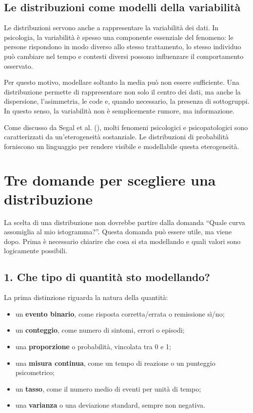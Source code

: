 \documentclass[
  italian,
  letterpaper,
  a4paper,
  11pt,
  open=any]{scrbook}
\providecommand{\tightlist}{%
  \setlength{\itemsep}{0pt}\setlength{\parskip}{0pt}}
\theoremstyle{plain}
\theoremstyle{definition}
\theoremstyle{definition}
\theoremstyle{remark}
\begin{document}
\subsection{Le distribuzioni come modelli della
variabilità}\label{le-distribuzioni-come-modelli-della-variabilituxe0}

Le distribuzioni servono anche a rappresentare la variabilità dei dati.
In psicologia, la variabilità è spesso una componente essenziale del
fenomeno: le persone rispondono in modo diverso allo stesso trattamento,
lo stesso individuo può cambiare nel tempo e contesti diversi possono
influenzare il comportamento osservato.

Per questo motivo, modellare soltanto la media può non essere
sufficiente. Una distribuzione permette di rappresentare non solo il
centro dei dati, ma anche la dispersione, l'asimmetria, le code e,
quando necessario, la presenza di sottogruppi. In questo senso, la
variabilità non è semplicemente rumore, ma informazione.

Come discusso da Segal et al. (),
molti fenomeni psicologici e psicopatologici sono caratterizzati da
un'eterogeneità sostanziale. Le distribuzioni di probabilità forniscono
un linguaggio per rendere visibile e modellabile questa eterogeneità.

\section{Tre domande per scegliere una
distribuzione}\label{sec-three-questions-distributions}

La scelta di una distribuzione non dovrebbe partire dalla domanda
``Quale curva assomiglia al mio istogramma?''. Questa domanda può essere
utile, ma viene dopo. Prima è necessario chiarire che cosa si sta
modellando e quali valori sono logicamente possibili.

\subsection{1. Che tipo di quantità sto
modellando?}\label{che-tipo-di-quantituxe0-sto-modellando}

La prima distinzione riguarda la natura della quantità:

\begin{itemize}
\tightlist
\item
  un \textbf{evento binario}, come risposta corretta/errata o remissione
  sì/no;
\item
  un \textbf{conteggio}, come numero di sintomi, errori o episodi;
\item
  una \textbf{proporzione} o probabilità, vincolata tra 0 e 1;
\item
  una \textbf{misura continua}, come un tempo di reazione o un punteggio
  psicometrico;
\item
  un \textbf{tasso}, come il numero medio di eventi per unità di tempo;
\item
  una \textbf{varianza} o una deviazione standard, sempre non negativa.
\end{itemize}
\end{document}
